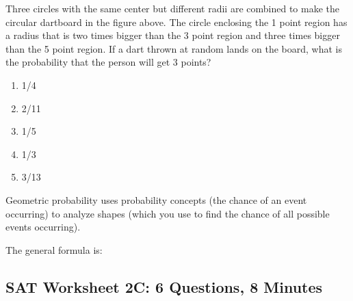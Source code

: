 \documentclass[12pt]{book}
\begin{document}
\begin{multienumerate}
{Three circles with the same center but different radii are combined to make the circular dartboard in the figure above. The circle enclosing the 1 point region has a radius that is two times bigger than the 3 point region and three times bigger than the 5 point region. If a dart thrown at random lands on the board, what is the probability that the person will get 3 points?

\begin{enumerate}[label=(\Alph*)]
\item 1/4
\item 2/11
\item 1/5
\item 1/3
\item 3/13
\end{enumerate}}
\end{multienumerate}

\hrulefill

\bigskip
Geometric probability uses probability concepts (the chance of an event occurring) to analyze shapes (which you use to find the chance of all possible events occurring).

\bigskip
The general formula is:

\vfill
\pagebreak
\subsection{SAT Worksheet 2C: 6 Questions, 8 Minutes}
\end{document}
